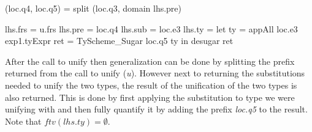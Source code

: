 \begin{code}    
(loc.q4, loc.q5) = split (loc.q3, domain lhs.pre)
    
lhs.frs = u.frs
lhs.pre = loc.q4
lhs.sub = loc.e3
lhs.ty  = let ty  = appAll loc.e3 exp1.tyExpr
              ret = TyScheme_Sugar loc.q5 ty
          in desugar ret
\end{code}
After the call to unify then generalization can be done by splitting the prefix returned from the call to unify (\emph{u}). However next to returning the substitutions needed to unify the two types, the result of the unification of the two types is also returned. This is done by first applying the substitution to type we were unifying with and then fully quantify it by adding the prefix \emph{loc.q5} to the result. Note that $ftv(lhs.ty)=\emptyset$.

